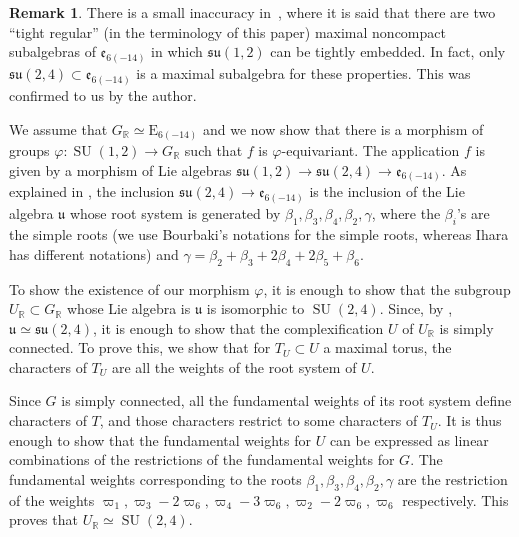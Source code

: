 \documentclass[JEP,XML,SOM,Unicode,NoFloatCountersInSection]{cedram}
\newcommand{\citestar}[3]{\cite[#3]{#1}}
\theoremstyle{plain}
\theoremstyle{definition}
\newtheorem{rema}[theo]{Remark}
\DeclareMathOperator{\SU}{SU}
\newcommand{\bR}{\mathbb{R}}
\newcommand{\fe}{\mathfrak{e}}
\newcommand{\fsu}{\mathfrak{su}}
\newcommand{\fu}{\mathfrak{u}}
\begin{document}
\begin{rema}
There is a small inaccuracy in~\cite{Hamlet}, where it is said that there are
two ``tight regular'' (in the terminology of this paper) maximal noncompact subalgebras of
${\fe}_{6(-14)}$ in which $\fsu(1,2)$ can be tightly embedded. In fact, only $\fsu(2,4)\subset
{\fe}_{6(-14)}$ is a maximal subalgebra for
these properties. This was confirmed to us by the
author.
\end{rema}

We assume that $G_\bR \simeq \mathrm{E}_{6(-14)}$ and
we now show that there is a morphism of groups $\varphi:\SU(1,2) \to G_\bR$ such that $f$ is
$\varphi$-equivariant. The application $f$ is given by a morphism
of Lie algebras $\fsu(1,2) \to \fsu(2,4) \to \fe_{6(-14)}$.
As explained in \citestar{ihara}*{},
the inclusion $\fsu(2,4) \to \fe_{6(-14)}$ is the
inclusion of the Lie algebra $\fu$ whose root system is generated by
$\beta_1,\beta_3,\beta_4,\beta_2,\gamma$, where the $\beta_i$'s are the simple roots
(we use Bourbaki's notations for the simple roots,
whereas Ihara has different notations) and
$\gamma=\beta_2+\beta_3+2\beta_4+2\beta_5+\beta_6$.

To show the existence of our morphism $\varphi$, it is enough to show that the
subgroup $U_\bR \subset G_\bR$ whose Lie algebra is $\fu$ is isomorphic to $\SU(2,4)$.
Since, by \citestar{ihara}*{}, $\fu \simeq \fsu(2,4)$, it is enough to show that
the complexification $U$ of $U_\bR$ is simply connected. To prove this, we show that for $T_U \subset U$
a maximal torus, the characters of $T_U$ are all the weights of the root system of $U$.

Since $G$ is simply connected, all the fundamental weights of its root system define characters of $T$, and
those characters restrict to some characters of $T_U$. It is thus enough to show that the fundamental weights
for $U$ can be expressed as linear combinations of the restrictions of the fundamental weights for $G$.
The fundamental weights corresponding to the roots $\beta_1,\beta_3,\beta_4,\beta_2,\gamma$ are the restriction
of the weights $\varpi_1,\varpi_3-2\varpi_6,\varpi_4-3\varpi_6,\varpi_2-2\varpi_6,\varpi_6$
respectively. This proves that $U_\bR \simeq \SU(2,4)$.
\end{document}
